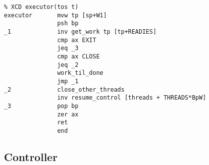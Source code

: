 {\small
\begin{verbatim}
% XCD executor(tos t)
executor       mvw tp [sp+W1]
               psh bp
_1             inv get_work tp [tp+READIES]
               cmp ax EXIT
               jeq _3
               cmp ax CLOSE
               jeq _2
               work_til_done
               jmp _1
_2             close_other_threads
               inv resume_control [threads + THREADS*BpW]
_3             pop bp
               zer ax
               ret
               end
\end{verbatim}}



\subsection{Controller}\label{framework}




